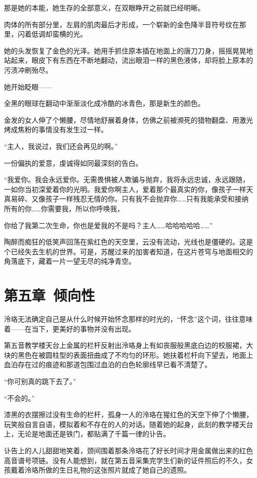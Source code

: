\documentclass[UTF8, scheme = chinese, openany]{ctexbook}
\begin{document}
那是她的本能，她生存的全部意义，在双眼睁开之前就已经明晰。

肉体的所有部分里，左肩的肌肉最后才形成，一个崭新的金色降半音符号纹在那里，闪着低调却蛮横的光。

她的头发恢复了金色的光泽。她用手抓住原本插在地面上的唐刀刀身，摇摇晃晃地站起来，眼皮下有东西在不断地翻动，流出眼泪一样的黑色液体，却将脸上原本的污渍冲刷殆尽。

她开始眨眼——

全黑的眼球在翻动中渐渐淡化成冷酷的冰青色，那是新生的颜色。

金发的女人伸了个懒腰，尽情地舒展着身体，仿佛之前被濒死的猎物翻盘、用激光烤成焦粉的事情没有发生过一样。

“主人，我说过，我们还会再见的啊。”

一份偏执的爱意，虔诚得如同最深刻的告白。

“我爱你。我会永远爱你。无需畏惧被人欺骗与抛弃，我将永远忠诚，永远跟随，一如你当初深爱着你的光明。我爱你啊主人，爱着那个最真实的你，像孩子一样天真易碎、又像孩子一样残忍无情的你。只有我不会抛弃你……只有我能承受和接纳所有的你……你需要我，所以你呼唤我，

你给了我第二次生命，你也是爱我的不是吗？主人……哈哈哈哈哈……”

陶醉而痴狂的低笑声回荡在紫红色的天空里，云没有流动，光线也是僵硬的。这是个已经失去生机的世界。可是，苏醒过来的加害者知道，在这片苍穹与地面相交的角落底下，藏着一片一望无尽的纯净青空。

\chapter{第五章\ 倾向性}

泠珞无法确定自己是从什么时候开始怀念那样的时光的，“怀念”这个词，往往意味着——在当下，更美好的事物并没有出现。

第五音教学楼天台上金属的栏杆反射出泠珞身上有如丧服般黑底白边的校服裙，大块的黑色在被圆柱型的表面扭曲成了不均匀的环形。她扶着栏杆向下望去，地面上血泊存在过的痕迹和那道包围过血泊的白色轮廓线早已看不清楚了。

“你可别真的跳下去了。”

“不会的。”

漆黑的衣摆擦过没有生命的栏杆，孤身一人的泠珞在猩红色的天空下伸了个懒腰，玩笑般自言自语，模拟着和不存在的人的对话。随着她的起身，此刻的教学楼天台上，无论是地面还是铁门，都贴满了千篇一律的讣告。

讣告上的人儿甜甜地笑着，颈间围着那条泠珞花了好长时间才用金属做出来的红色高音谱号项链。没有人能想到，就在第五音采集完学生们新的证件照后的不久，女孩戴着泠珞所做的生日礼物的这张照片就成了她自己的遗照。
\end{document}
